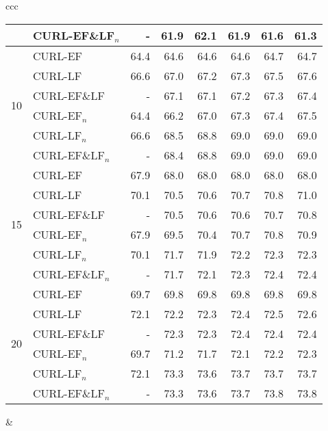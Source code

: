 \documentclass[journal,11pt]{IEEEtran}
\begin{document}
\begin{table*}[!ht]
\begin{center}
{\begin{tabular}{ccc}
\begin{tabular}{|r|l|rrrrrr|}
& CURL-EF\&LF$_n$ & - & 61.9 & 62.1 & 61.9 & 61.6 & 61.3 \\
\hline
\multirow{6}{*}{10}
& CURL-EF & 64.4 & 64.6 & 64.6 & 64.6 & 64.7 & 64.7 \\
& CURL-LF & 66.6 & 67.0 & 67.2 & 67.3 & 67.5 & 67.6 \\
& CURL-EF\&LF & - & 67.1 & 67.1 & 67.2 & 67.3 & 67.4 \\
& CURL-EF$_n$ & 64.4 & 66.2 & 67.0 & 67.3 & 67.4 & 67.5 \\
& CURL-LF$_n$ & 66.6 & 68.5 & 68.8 & 69.0 & 69.0 & 69.0 \\
& CURL-EF\&LF$_n$ & - & 68.4 & 68.8 & 69.0 & 69.0 & 69.0 \\
\hline
\multirow{6}{*}{15}
& CURL-EF & 67.9 & 68.0 & 68.0 & 68.0 & 68.0 & 68.0 \\
& CURL-LF & 70.1 & 70.5 & 70.6 & 70.7 & 70.8 & 71.0 \\
& CURL-EF\&LF & - & 70.5 & 70.6 & 70.6 & 70.7 & 70.8 \\
& CURL-EF$_n$ & 67.9 & 69.5 & 70.4 & 70.7 & 70.8 & 70.9 \\
& CURL-LF$_n$ & 70.1 & 71.7 & 71.9 & 72.2 & 72.3 & 72.3 \\
& CURL-EF\&LF$_n$ & - & 71.7 & 72.1 & 72.3 & 72.4 & 72.4 \\
\hline
\multirow{6}{*}{20}
& CURL-EF & 69.7 & 69.8 & 69.8 & 69.8 & 69.8 & 69.8 \\
& CURL-LF & 72.1 & 72.2 & 72.3 & 72.4 & 72.5 & 72.6 \\
& CURL-EF\&LF & - & 72.3 & 72.3 & 72.4 & 72.4 & 72.4 \\
& CURL-EF$_n$ & 69.7 & 71.2 & 71.7 & 72.1 & 72.2 & 72.3 \\
& CURL-LF$_n$ & 72.1 & 73.3 & 73.6 & 73.7 & 73.7 & 73.7 \\
& CURL-EF\&LF$_n$ & - & 73.3 & 73.6 & 73.7 & 73.8 & 73.8 \\
\hline
\end{tabular}

& 


\end{tabular}}
\end{center}
\end{table*}
\end{document}
